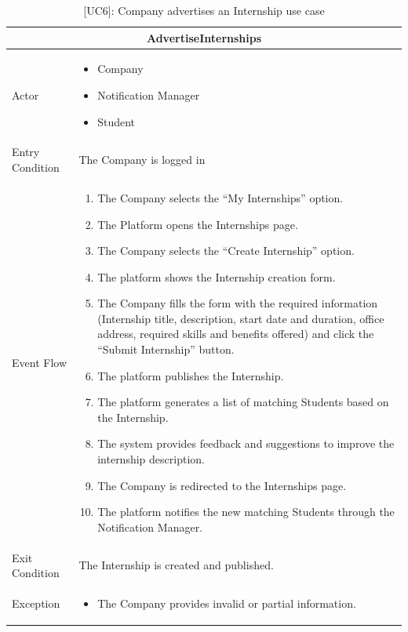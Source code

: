 \begin{table}[H]
    \centering
    \begin{tabular}{|p{3cm}|p{12cm}|}
    \hline
    \multicolumn{2}{|c|}{\textbf{AdvertiseInternships}} \\ \hline
    Actor & 
    \begin{itemize}
        \item Company
        \item Notification Manager
        \item Student
    \end{itemize}\\ \hline
    Entry Condition & The Company is logged in\\ \hline
    Event Flow &
    \begin{enumerate}         
        \item The Company selects the “My Internships” option.
        \item The Platform opens the Internships page.
        \item The Company selects the “Create Internship” option.
        \item The platform shows the Internship creation form.
        \item The Company fills the form with the required information (Internship title, description, start date and duration, office address, required skills and benefits offered) and click the “Submit Internship” button.
        \item The platform publishes the Internship.
        \item The platform generates a list of matching Students based on the Internship.
        \item The system provides feedback and suggestions to improve the internship description.
        \item The Company is redirected to the Internships page.
        \item The platform notifies the new matching Students through the Notification Manager. 
    \end{enumerate} \\ \hline
    Exit Condition & The Internship is created and published.\\ \hline
    Exception & 
    \begin{itemize}        
        \item The Company provides invalid or partial information.
    \end{itemize} \\ \hline
    \end{tabular}
    \caption{[UC6]: Company advertises an Internship use case}
    \label{tab:UC6}
\end{table}

